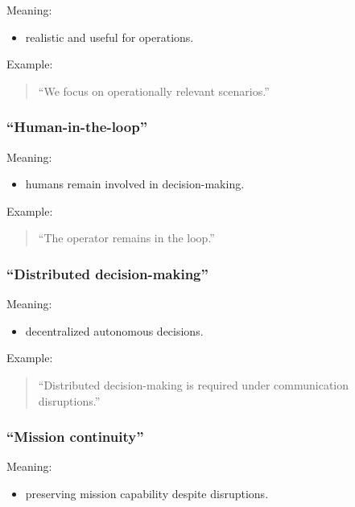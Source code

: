\documentclass[10pt,a4paper,twocolumn]{article}
\begin{document}
Meaning:
\begin{itemize}
    \item realistic and useful for operations.
\end{itemize}

Example:
\begin{quote}
    ``We focus on operationally relevant scenarios.''
\end{quote}


\subsubsection*{``Human-in-the-loop''}

Meaning:
\begin{itemize}
    \item humans remain involved in decision-making.
\end{itemize}

Example:
\begin{quote}
    ``The operator remains in the loop.''
\end{quote}


\subsubsection*{``Distributed decision-making''}

Meaning:
\begin{itemize}
    \item decentralized autonomous decisions.
\end{itemize}

Example:
\begin{quote}
    ``Distributed decision-making is required under communication disruptions.''
\end{quote}


\subsubsection*{``Mission continuity''}

Meaning:
\begin{itemize}
    \item preserving mission capability despite disruptions.
\end{itemize}
\end{document}

